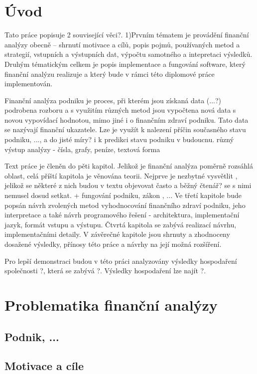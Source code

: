\chapter{Úvod}
Tato práce popisuje 2 související věci?. 
1)Prvním tématem je provádění finanční analýzy obecně -- shrnutí motivace a cílů, popis pojmů, používaných metod a strategií, vstupních a výstupních dat, výpočtu samotného a intepretaci výsledků. Druhým tématickým celkem je popis implementace a fungování software, který finanční analýzu realizuje a který bude v rámci této diplomové práce implementován.

Finanční analýza podniku je proces, při kterém jsou získaná data (...?) podrobena rozboru a s využitím různých metod jsou vypočtena nová data s novou vypovídací hodnotou, mimo jiné i o finančním zdraví podniku. Tato data se nazývají finanční ukazatele. Lze je využít k nalezení příčin současného stavu podniku, ..., a do jisté míry? i k predikci stavu podniku v budoucnu.
různý výstup analýzy - čísla, grafy, peníze, textová forma

Text práce je členěn do pěti kapitol. Jelikož je finanční analýza poměrně rozsáhlá oblast, celá příští kapitola je věnována teorii. Nejprve je nezbytné vysvětlit , jelikož se některé z nich budou v textu objevovat často a běžný čtenář? se s nimi nemusel dosud setkat. + fungování podniku, zákon , ...
Ve třetí kapitole bude popsán návrh zvolených metod vyhodnocování finančního zdraví podniku, jeho interpretace a také návrh programového řešení - architektura, implementační jazyk, formát vstupu a výstupu. Čtvrtá kapitola se zabývá realizací návrhu, implementačními detaily. V závěrečné kapitole jsou shrnuty a zhodnoceny dosažené výsledky, přínosy této práce a návrhy na její možná rozšíření.

Pro lepší demonstraci budou v této práci analyzovány výsledky hospodaření společnosti ?, která se zabývá ?. Výsledky hospodaření lze najít ?.

\chapter{Problematika finanční analýzy}

\section{Podnik, ...}
\section{Motivace a cíle}
